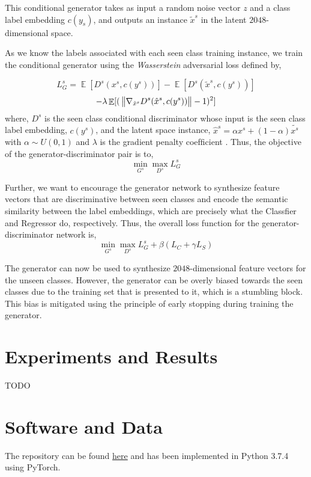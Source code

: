 \documentclass{article}
\DeclareMathOperator{\E}{\mathbb{E}}
\begin{document}
\begin{enumerate}
	This conditional generator takes as input a random noise vector $z$ and a class label embedding $c(y_s)$,  and outputs an instance $\tilde{x}^s$ in the latent $2048$-dimensional space. 

	As we know the labels associated with each seen class training instance, we train the conditional generator using the \textit{Wasserstein} adversarial loss defined by,
	
	\begin{equation*}
		L_G^s = \E[D^s(x^s, c(y^s))] - \E[D^s(\tilde{x}^s, c(y^s))]
	\end{equation*}
	\begin{equation}
		- \lambda \E[( ~ \norm{\nabla_{\hat{x}^s} D^s(\hat{x}^s, c(y^s))} - 1)^2]	
	\end{equation}
	where, $D^s$ is the seen class conditional discriminator whose input is the seen class label embedding, $c(y^s)$, and the latent space instance, $\hat{x}^s = \alpha x^s + (1 - \alpha) \tilde{x^s}$ with $\alpha \sim U(0,1)$ and $\lambda$ is the gradient penalty coefﬁcient \citep{wgangp}. Thus, the objective of the generator-discriminator pair is to,
	\begin{equation}
		\min_{G^s} \max_{D^s}	L_G^s
	\end{equation}
\end{enumerate}

Further, we want to encourage the generator network to synthesize feature vectors that are discriminative between seen classes and encode the semantic similarity between the label embeddings, which are precisely what the Classfier and Regressor do, respectively. Thus, the overall loss function for the generator-discriminator network is,
\begin{equation}
	\min_{G^s} \max_{D^s}	L_G^s + \beta (L_C + \gamma L_S)
\end{equation}

The generator can now be used to synthesize $2048$-dimensional feature vectors for the unseen classes. However, the generator can be overly biased towards the seen classes due to the training set that is presented to it, which is a stumbling block. This bias is mitigated using the principle of early stopping during training the generator. 

\section{Experiments and Results}
\label{experiments}
TODO

\medskip

\section*{Software and Data}
The repository can be found \href{https://github.com/deepeshhada/SABR}{here} and has been implemented in Python 3.7.4 using PyTorch.

\medskip



\end{document}
